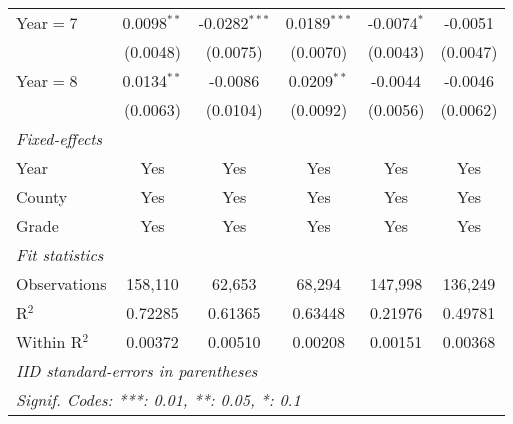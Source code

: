\begin{table}[htbp]
\begin{tabular}{lccccc}
      Year$=$7             & 0.0098$^{**}$   & -0.0282$^{***}$        & 0.0189$^{***}$ & -0.0074$^{*}$   & -0.0051\\
                           & (0.0048)        & (0.0075)               & (0.0070)       & (0.0043)        & (0.0047)\\
      Year$=$8             & 0.0134$^{**}$   & -0.0086                & 0.0209$^{**}$  & -0.0044         & -0.0046\\
                           & (0.0063)        & (0.0104)               & (0.0092)       & (0.0056)        & (0.0062)\\
      \midrule \emph{Fixed-effects} &   &   &   &   &  \\
      Year                 & Yes             & Yes                    & Yes            & Yes             & Yes\\
      County               & Yes             & Yes                    & Yes            & Yes             & Yes\\
      Grade                & Yes             & Yes                    & Yes            & Yes             & Yes\\
      \midrule \emph{Fit statistics} &   &   &   &   &  \\
      Observations         & 158,110         & 62,653                 & 68,294         & 147,998         & 136,249\\
      R$^2$                & 0.72285         & 0.61365                & 0.63448        & 0.21976         & 0.49781\\
      Within R$^2$         & 0.00372         & 0.00510                & 0.00208        & 0.00151         & 0.00368\\
      \midrule\midrule\multicolumn{6}{l}{\emph{IID standard-errors in parentheses}}\\
      \multicolumn{6}{l}{\emph{Signif. Codes: ***: 0.01, **: 0.05, *: 0.1}}\\
   \end{tabular}
\end{table}


